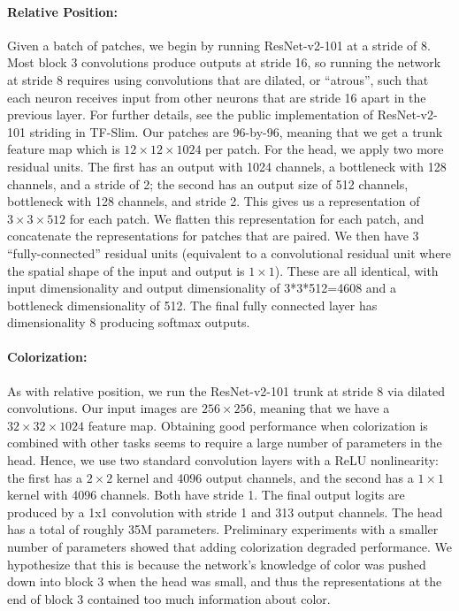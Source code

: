 \documentclass[10pt,twocolumn,letterpaper]{article}
\begin{document}
\paragraph{Relative Position:}
Given a batch of patches, we begin by running ResNet-v2-101 at a stride of 8.
Most block 3 convolutions produce outputs at stride 16, so running the network at stride 8 requires using convolutions that are dilated, or ``atrous'', such that each neuron receives input from other neurons that are stride 16 apart in the previous layer.
For further details, see the public implementation of ResNet-v2-101 striding in TF-Slim.  
Our patches are 96-by-96, meaning that we get a trunk feature map which is $12 \times 12 \times 1024$ per patch.
For the head, we apply two more residual units.
The first has an output with 1024 channels, a bottleneck with 128 channels, and a stride of 2; the second has an output size of 512 channels, bottleneck with 128 channels, and stride 2.
This gives us a representation of $3 \times 3 \times 512$ for each patch.
We flatten this representation for each patch, and concatenate the representations for patches that are paired.
We then have 3 ``fully-connected'' residual units (equivalent to a convolutional residual unit where the spatial shape of the input and output is $1 \times 1$).
These are all identical, with input dimensionality and output dimensionality of 3*3*512=4608 and a bottleneck dimensionality of 512.  
The final fully connected layer has dimensionality 8 producing softmax outputs.

\paragraph{Colorization:}
As with relative position, we run the ResNet-v2-101 trunk at stride 8 via dilated convolutions.
Our input images are $256 \times 256$, meaning that we have a $32 \times 32 \times 1024$ feature map.
Obtaining good performance when colorization is combined with other tasks seems to require a large number of parameters in the head.
Hence, we use two standard convolution layers with a ReLU nonlinearity: the first has a $2 \times 2$ kernel and 4096 output channels, and the second has a $1 \times 1$ kernel with 4096 channels.
Both have stride 1.
The final output logits are produced by a 1x1 convolution with stride 1 and 313 output channels.
The head has a total of roughly 35M parameters.
Preliminary experiments with a smaller number of parameters showed that adding colorization degraded performance.
We hypothesize that this is because the network's knowledge of color was pushed down into block 3 when the head was small, and thus the representations at the end of block 3 contained too much information about color.
\end{document}
